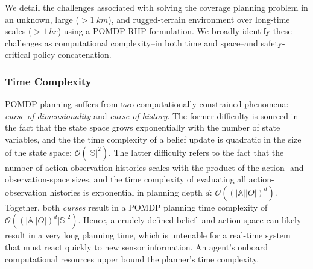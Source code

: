 \documentclass[letterpaper]{article} %
\begin{document}

 
   
We detail the challenges associated with solving the coverage planning problem in an unknown, large ($>\!\!1~km$), and rugged-terrain environment over long-time scales ($>\!\!1~hr$) using a POMDP-RHP formulation. We broadly identify these challenges as computational complexity--in both time and space--and safety-critical policy concatenation.

\subsubsection{Time Complexity} \hfill

\noindent
POMDP planning suffers from two computationally-constrained phenomena: \textit{curse of dimensionality} and \textit{curse of history}. The former difficulty is sourced in the fact that the state space grows exponentially with the number of state variables, and the the time complexity of a belief update is quadratic in the size of the state space: $\mathcal{O}(|\mathbb{S}|^2)$. The latter difficulty refers to the fact that the number of action-observation histories scales with the product of the action- and observation-space sizes, and the time complexity of evaluating all action-observation histories is exponential in planning depth $d$: $\mathcal{O}((|\mathbb{A}||O|)^d)$. Together, both \textit{curses} result in a POMDP planning time complexity of $\mathcal{O}((|\mathbb{A}||O|)^d|\mathbb{S}|^2)$. Hence, a crudely defined belief- and action-space can likely result in a very long planning time, which is untenable for a real-time system that must react quickly to new sensor information. An agent's onboard computational resources upper bound the planner's time complexity.
\end{document}
